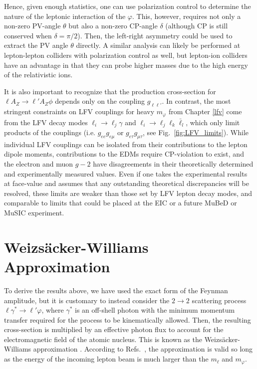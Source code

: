 Hence, given enough statistics, one can use polarization control to determine the nature of the leptonic interaction of the $\varphi$.  This, however, requires not only a non-zero PV-angle $\theta$ but also a non-zero CP-angle $\delta$ (although CP is still conserved when $\delta = \pi/2$). Then, the left-right asymmetry could be used to extract the PV angle $\theta$ directly. A similar analysis can likely be performed at lepton-lepton colliders with polarization control as well, but lepton-ion colliders have an advantage in that they can probe higher masses due to the high energy of the relativistic ions.

It is also important to recognize that the production cross-section for $\ell A_Z \rightarrow \ell'A_Z \phi$ depends only on the coupling $g_{\ell\ell'}$. In contrast, the most stringent constraints on LFV couplings for heavy $m_\varphi$ from Chapter \ref{lfv} come from the LFV decay modes $\ell_i \rightarrow \ell_j\gamma$ and $\ell_i \rightarrow \ell_j\ell_k\bar{\ell}_l$, which only limit products of the couplings (i.e. $g_{ee}g_{e\mu}$ or $g_{e\tau}g_{\mu\tau}$, see Fig.~\ref{fig:LFV_limits}). While individual LFV couplings can be isolated from their contributions to the lepton dipole moments, contributions to the EDMs require CP-violation to exist, and the electron and muon $g-2$ have disagreements in their theoretically determined and experimentally measured values. Even if one takes the experimental results at face-value and assumes that any outstanding theoretical discrepancies will be resolved, these limits are weaker than those set by LFV lepton decay modes, and comparable to limits that could be placed at the EIC or a future MuBeD or MuSIC experiment.


\section{Weizs\"acker-Williams Approximation}\label{sec:WW}
To derive the results above, we have used the exact form of the Feynman amplitude, but it is customary to instead consider the $2\rightarrow 2$ scattering process $\ell\gamma^* \rightarrow \ell'\varphi$, where $\gamma^*$ is an off-shell photon with the minimum momentum transfer required for the process to be kinematically allowed. Then, the resulting cross-section is multiplied by an effective photon flux to account for the electromagnetic field of the atomic nucleus. This is known as the Weizs\"acker-Williams approximation \cite{vonWeizsacker:1934nji,Williams:1935dka}. According to Refs.~\cite{Kim:1973he,Tsai:1973py}, the approximation is valid so long as the energy of the incoming lepton beam is much larger than the $m_\ell$ and $m_\varphi$.

